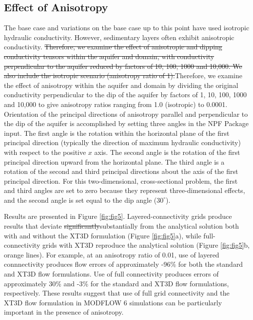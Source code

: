 \documentclass{article}
\begin{document}
\subsection*{Effect of Anisotropy}

The base case and variations {\color{red} on the base case} up to this point have used isotropic hydraulic conductivity. However, sedimentary layers often exhibit anisotropic conductivity. {\color{red} \sout{Therefore, we examine the effect of anisotropic and dipping conductivity tensors within the aquifer and domain, with conductivity perpendicular to the aquifer reduced by factors of 10, 100, 1000 and 10,000. We also include the isotropic scenario (anisotropy ratio of 1).}Therefore, we examine the effect of anisotropy within the aquifer and domain by dividing the original conductivity perpendicular to the dip of the aquifer by factors of 1, 10, 100, 1000 and 10,000 to give anisotropy ratios ranging from 1.0 (isotropic) to 0.0001.} {\color{red} Orientation of the principal directions of anisotropy parallel and perpendicular to the dip of the aquifer is accomplished by setting three angles in the NPF Package input. The first angle is the rotation within the horizontal plane of the first principal direction (typically the direction of maximum hydraulic conductivity) with respect to the positive $x$ axis. The second angle is the rotation of the first principal direction upward from the horizontal plane. The third angle is a rotation of the second and third principal directions about the axis of the first principal direction. For this two-dimensional, cross-sectional problem, the first and third angles are set to zero because they represent three-dimensional effects, and the second angle is set equal to the dip angle ($30^{\circ}$).}

Results are presented in Figure \ref{fig:fig5}. Layered-connectivity grids produce results that deviate {\color{red} \sout{significantly}substantially} from the analytical solution both with and without the XT3D formulation (Figure \ref{fig:fig5}a), while full-connectivity grids with XT3D reproduce the analytical solution (Figure \ref{fig:fig5}b, orange lines). {\color{red} For example, at an anisotropy ratio of 0.01, use of layered connnectivity produces flow errors of approximately -96\% for both the standard and XT3D flow formulations. Use of full connectivity produces errors of approximately 30\% and -3\% for the standard and XT3D flow formulations, respectively.} {\color{red} These results suggest that use of full grid connectivity and the XT3D flow formulation in MODFLOW 6 simulations can be particularly important in the presence of anisotropy.}
\end{document}
